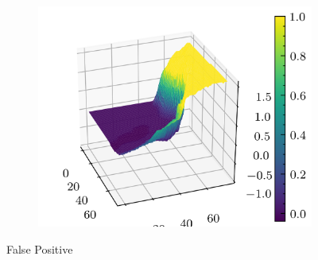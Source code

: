 \documentclass[../document.tex]{subfiles}
\begin{document}
\begin{figure}[H]
\begin{subfigure}[b]{0.19\textwidth}
        \includegraphics[width=\linewidth]{../img/5/quarry/false_positive/patch-3d-4.png}
    \end{subfigure}  

\caption{False Positive}    
\end{figure}
\end{document}
